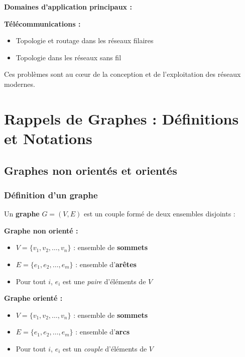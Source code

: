 \documentclass[12pt,a4paper]{article}
\begin{document}
\begin{notecours}
\textbf{Domaines d'application principaux :}

\textcolor{titrebleu}{\textbf{Télécommunications :}}
\begin{itemize}
    \item Topologie et routage dans les réseaux filaires
    \item Topologie dans les réseaux sans fil
\end{itemize}

Ces problèmes sont au cœur de la conception et de l'exploitation des réseaux modernes.
\end{notecours}

\newpage
\section{Rappels de Graphes : Définitions et Notations}

\subsection{Graphes non orientés et orientés}

\subsubsection{Définition d'un graphe}

\begin{definition}
Un \textbf{graphe} $G = (V, E)$ est un couple formé de deux ensembles disjoints :

\textbf{Graphe non orienté :}
\begin{itemize}
    \item $V = \{v_1, v_2, \ldots, v_n\}$ : ensemble de \textcolor{titrebleu}{\textbf{sommets}}
    \item $E = \{e_1, e_2, \ldots, e_m\}$ : ensemble d'\textcolor{defvert}{\textbf{arêtes}}
    \item Pour tout $i$, $e_i$ est une \textit{paire} d'éléments de $V$
\end{itemize}

\textbf{Graphe orienté :}
\begin{itemize}
    \item $V = \{v_1, v_2, \ldots, v_n\}$ : ensemble de \textcolor{titrebleu}{\textbf{sommets}}
    \item $E = \{e_1, e_2, \ldots, e_m\}$ : ensemble d'\textcolor{algoviolet}{\textbf{arcs}}
    \item Pour tout $i$, $e_i$ est un \textit{couple} d'éléments de $V$
\end{itemize}
\end{definition}
\end{document}
